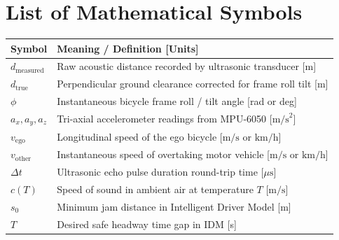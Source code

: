 \clearpage
\section*{List of Mathematical Symbols}
\begin{table}[h!]
	\centering
	\setlength{\tabcolsep}{10pt}
	\renewcommand{\arraystretch}{1.25}
	\begin{tabularx}{\textwidth}{p{3.2cm}X}
		\toprule
		\textbf{Symbol} & \textbf{Meaning / Definition [Units]} \\
		\midrule
		$d_{\text{measured}}$ & Raw acoustic distance recorded by ultrasonic transducer [m] \\
		$d_{\text{true}}$ & Perpendicular ground clearance corrected for frame roll tilt [m] \\
		$\phi$ & Instantaneous bicycle frame roll / tilt angle [rad or deg] \\
		$a_x, a_y, a_z$ & Tri-axial accelerometer readings from MPU-6050 [$\text{m/s}^2$] \\
		$v_{\text{ego}}$ & Longitudinal speed of the ego bicycle [$\text{m/s}$ or $\text{km/h}$] \\
		$v_{\text{other}}$ & Instantaneous speed of overtaking motor vehicle [$\text{m/s}$ or $\text{km/h}$] \\
		$\Delta t$ & Ultrasonic echo pulse duration round-trip time [$\mu\text{s}$] \\
		$c(T)$ & Speed of sound in ambient air at temperature $T$ [$\text{m/s}$] \\
		$s_0$ & Minimum jam distance in Intelligent Driver Model [m] \\
		$T$ & Desired safe headway time gap in IDM [s] \\
		\bottomrule
	\end{tabularx}
\end{table}
